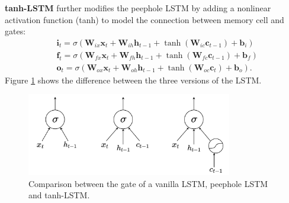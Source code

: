 \documentclass[11pt]{article}
\begin{document}
\textbf{tanh-LSTM} further modifies the peephole LSTM by adding a nonlinear activation function (tanh) to model the connection between memory cell and gates:
\begin{align}
    \label{eq10} &\mathbf{i}_t = \sigma(\mathbf{W}_{ix}\mathbf{x}_t+\mathbf{W}_{ih}\mathbf{h}_{t-1}+\tanh(\mathbf{W}_{ic}\mathbf{c}_{t-1}) + \mathbf{b}_i) \\
    \label{eq11} &\mathbf{f}_t = \sigma(\mathbf{W}_{fx}\mathbf{x}_t + \mathbf{W}_{fh}\mathbf{h}_{t-1} + \tanh(\mathbf{W}_{fc}\mathbf{c}_{t-1}) + \mathbf{b}_f)\\
    \label{eq12} &\mathbf{o}_t = \sigma(\mathbf{W}_{ox}\mathbf{x}_t + \mathbf{W}_{oh}\mathbf{h}_{t-1}+\tanh(\mathbf{W}_{oc}\mathbf{c}_{t}) + \mathbf{b}_o).
\end{align}
Figure \ref{fig:lstm} shows the difference between the three versions of the LSTM.
\begin{figure}[h]
    \centering
    \includegraphics[width=0.8\textwidth]{lstm.png}
    \caption{Comparison between the gate of a vanilla LSTM, peephole LSTM and tanh-LSTM.}
    \label{fig:lstm}
\end{figure}
\end{document}

